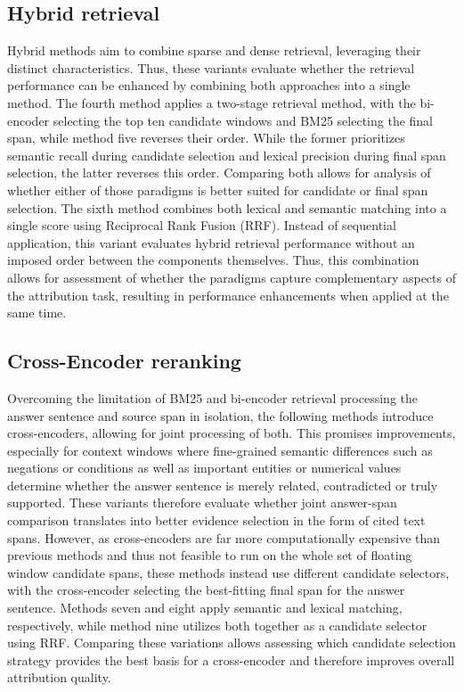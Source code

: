 \subsection{Hybrid retrieval }
Hybrid methods aim to combine sparse and dense retrieval, leveraging their distinct characteristics. Thus, these variants evaluate whether the retrieval performance can be enhanced by combining both approaches into a single method. 
The fourth method applies a two-stage retrieval method, with the bi-encoder selecting the top ten candidate windows and BM25 selecting the final span, while method five reverses their order. While the former prioritizes semantic recall during candidate selection and lexical precision during final span selection, the latter reverses this order. Comparing both allows for analysis of whether either of those paradigms is better suited for candidate or final span selection. 
The sixth method combines both lexical and semantic matching into a single score using Reciprocal Rank Fusion (RRF). Instead of sequential application, this variant evaluates hybrid retrieval performance without an imposed order between the components themselves. Thus, this combination allows for assessment of whether the paradigms capture complementary aspects of the attribution task, resulting in performance enhancements when applied at the same time. 

\subsection{Cross-Encoder reranking}
Overcoming the limitation of BM25 and bi-encoder retrieval processing the answer sentence and source span in isolation, the following methods introduce cross-encoders, allowing for joint processing of both. This promises improvements, especially for context windows where fine-grained semantic differences such as negations or conditions as well as important entities or numerical values determine whether the answer sentence is merely related, contradicted or truly supported. These variants therefore evaluate whether joint answer-span comparison translates into better evidence selection in the form of cited text spans.
However, as cross-encoders are far more computationally expensive than previous methods and thus not feasible to run on the whole set of floating window candidate spans, these methods instead use different candidate selectors, with the cross-encoder selecting the best-fitting final span for the answer sentence.
Methods seven and eight apply semantic and lexical matching, respectively, while method nine utilizes both together as a candidate selector using RRF. Comparing these variations allows assessing which candidate selection strategy provides the best basis for a cross-encoder and therefore improves overall attribution quality.

